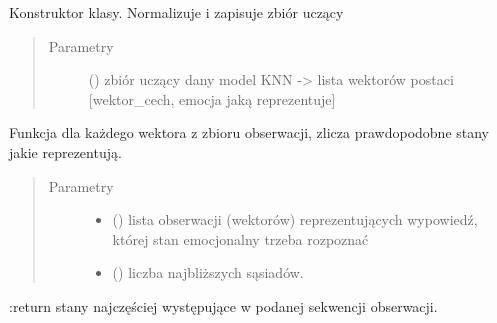 \documentclass[letterpaper,10pt,polish]{sphinxmanual}
\begin{document}
\begin{fulllineitems}
\begin{fulllineitems}
\label{\detokenize{KNN:KNN.KNN.__init__}}
Konstruktor klasy.
Normalizuje i zapisuje zbiór uczący
\begin{quote}\begin{description}
\item[{Parametry}] \leavevmode
{} () \textendash{} zbiór uczący dany model KNN -\textgreater{} lista wektorów postaci
{[}wektor\_cech, emocja jaką reprezentuje{]}

\end{description}\end{quote}

\end{fulllineitems}


\begin{fulllineitems}
\label{\detokenize{KNN:KNN.KNN.compute_emotion}}
Funkcja dla każdego wektora z zbioru obserwacji, zlicza prawdopodobne stany jakie reprezentują.
\begin{quote}\begin{description}
\item[{Parametry}] \leavevmode\begin{itemize}
\item {} 
 () \textendash{} lista obserwacji (wektorów) reprezentujących wypowiedź, której stan emocjonalny trzeba
rozpoznać

\item {} 
 () \textendash{} liczba najbliższych sąsiadów.

\end{itemize}

\end{description}\end{quote}

:return stany najczęściej występujące w podanej sekwencji obserwacji.

\end{fulllineitems}



\end{fulllineitems}
\end{document}
